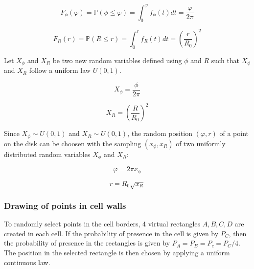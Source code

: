 \begin{appendix}
\begin{equation}
F_\phi(\varphi) = \mathbb{P}(\phi \leq \varphi) =  \int_0^\varphi f_\phi(t) dt = \frac{\varphi }{2 \pi}
\end{equation}

\begin{equation}
F_R(r) = \mathbb{P}(R \leq r) =  \int_0^r f_R(t) dt = \left( \frac{r}{R_0} \right)^2
\end{equation}

\medskip

Let \( X_\phi \) and \( X_R \) be two new random variables defined using \( \phi \) and \( R \) such that \( X_\phi \) and \( X_R \) follow a uniform law \( U(0, 1) \).

\begin{equation}
X_\phi = \frac{\phi}{2 \pi}
\end{equation}

\begin{equation}
  X_R = \left( \frac{R}{R_0} \right)^2
\end{equation}

\medskip

Since \( X_\phi \sim U(0, 1) \) and \( X_R \sim U(0, 1) \), the random position \( (\varphi, r)\) of a point on the disk can be choosen with the sampling \( ( x_\phi, x_R ) \) of two uniformly distributed random variables \( X_\phi \) and \( X_R \):

\begin{equation}\label{eq:circle-random-position-theta}
\varphi = 2 \pi x_\phi
\end{equation}

\begin{equation}\label{eq:circle-random-position-r}
r = R_0 \sqrt{x_R}
\end{equation}

\subsubsection{Drawing of points in cell walls}\label{sec:cell-random-position}


To randomly select points in the cell borders, 4 virtual rectangles \( A, B, C, D \) are created in each cell. If the probability of presence in the cell is given by \( P_C \), then the probability of presence in the rectangles is given by \( P_A = P_B = P_c = P_C / 4 \).
The position in the selected rectangle is then chosen by applying a uniform continuous law.


\end{appendix}
